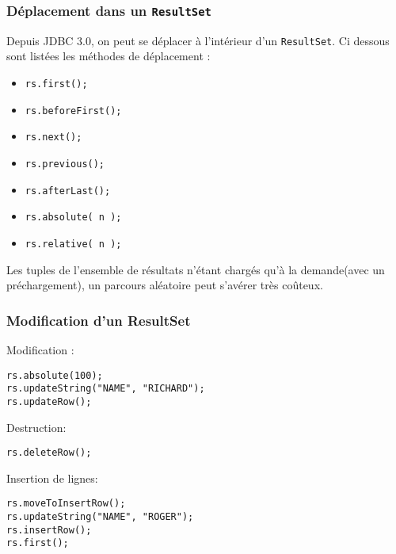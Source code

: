 \documentclass[xcolor=pdftex,x11names,table]{beamer}
\begin{document}
    \begin{frame}
    \frametitle{Déplacement dans un \lstinline$ResultSet$}
      Depuis JDBC 3.0, on peut se déplacer à l'intérieur d'un \lstinline$ResultSet$. Ci dessous sont 
      listées les méthodes de déplacement :
      \begin{itemize}
    		\item \lstinline$rs.first();$
    		\item \lstinline$rs.beforeFirst();$
    		\item \lstinline$rs.next();$
    		\item \lstinline$rs.previous();$
    		\item \lstinline$rs.afterLast();$
    		\item \lstinline$rs.absolute( n );$
    		\item \lstinline$rs.relative( n );$
    	\end{itemize}
    	Les tuples de l'ensemble de résultats n'étant chargés qu'à la demande(avec un préchargement), 
    	un parcours aléatoire peut s'avérer très coûteux. 
    \end{frame}  
    
    \begin{frame}
    \frametitle{Modification d'un ResultSet}
      Modification :
			\begin{block}{}
        \lstinline$rs.absolute(100);$\\
        \lstinline$rs.updateString("NAME", "RICHARD");$\\
        \lstinline$rs.updateRow();$\\
      \end{block}
      Destruction: 
      \begin{block}{}
        \lstinline$rs.deleteRow();$\\
      \end{block}
      Insertion de lignes:
      \begin{block}{}
        \lstinline$rs.moveToInsertRow();$\\
        \lstinline$rs.updateString("NAME", "ROGER");$\\
        \lstinline$rs.insertRow();$\\
        \lstinline$rs.first();$\\
      \end{block}
    \end{frame}  
    
\end{document}

